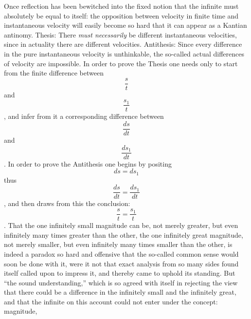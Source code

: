 \documentclass[12pt,a4paper,openany]{book}
\begin{document}
Once reflection has been bewitched into the fixed notion that the infinite must absolutely be equal to itself: the opposition between velocity in finite time and instantaneous velocity will easily become so hard that it can appear as a Kantian antinomy. Thesis: There \emph{must necessarily} be different instantaneous velocities, since in actuality there are different velocities. Antithesis: Since every difference in the pure instantaneous velocity is unthinkable, the so-called actual differences of velocity are impossible. In order to prove the Thesis one needs only to start from the finite difference between
\[ \frac{s}{t} \]
and
\[ \frac{s_{1}}{t} \]
, and
infer from it a corresponding difference between
\[ \frac{ds}{dt} \]
and
\[ \frac{ds_{1}}{dt} \]
. In order to prove the Antithesis one begins by positing
\[ ds=ds_{1} \]
thus
\[ \frac{ds}{dt}=\frac{ds_{1}}{dt} \]
, and then draws from this the conclusion: %
\[ \frac{s}{t}=\frac{s_{1}}{t} \]
. That the one infinitely small magnitude can be, not merely greater, but even infinitely many times greater than the other, the one infinitely great magnitude, not merely smaller, but even infinitely many times smaller than the other, is indeed a paradox so hard and offensive that the so-called common sense would soon be done with it, were it not that exact analysis from so many sides found itself called upon to impress it, and thereby came to uphold its standing. But ``the sound understanding,'' which is so agreed with itself in rejecting the view that there could be a difference in the infinitely small and the infinitely great, and that the infinite on this account could not enter under the concept: magnitude, %
\setcounter{footnote}{0}%
\end{document}
